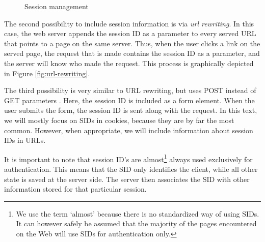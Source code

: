 \begin{figure}[ht]
	\centering
	\caption{Session management}
\end{figure}

The second possibility to include session information is via \emph{\gls{url} rewriting}. In this case, the web server appends the session ID as a parameter to every served URL that points to a page on the same server. Thus, when the user clicks a link on the served page, the request that is made contains the session ID as a parameter, and the server will know who made the request. This process is graphically depicted in Figure \ref{fig:url-rewriting}.

The third possibility is very similar to URL rewriting, but uses POST instead of GET parameters \cite{Johns2006}. Here, the session ID is included as a form element. When the user submits the form, the session ID is sent along with the request. In this text, we will mostly focus on SIDs in cookies, because they are by far the most common. However, when appropriate, we will include information about session IDs in URLs.

It is important to note that session ID's are almost\footnote{We use the term `almost' because there is no standardized way of using SIDs. It can however safely be assumed that the majority of the pages encountered on the Web will use SIDs for authentication only.} always used exclusively for authentication. This means that the SID only identifies the client, while all other state is saved at the server side. The server then associates the SID with other information stored for that particular session.

